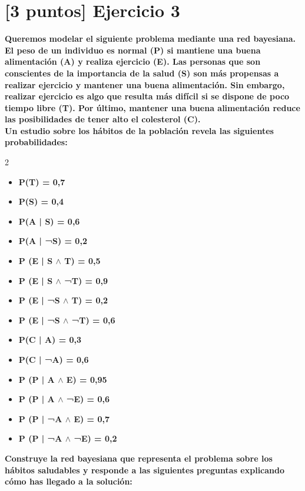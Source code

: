 \newpage
{}
\section{[3 puntos] Ejercicio 3}
\textbf{Queremos modelar el siguiente problema mediante una red bayesiana. El
peso de un individuo es normal (P) si mantiene una buena alimentación (A) y realiza
ejercicio (E). Las personas que son conscientes de la importancia de la salud (S) son
más propensas a realizar ejercicio y mantener una buena alimentación. Sin embargo,
realizar ejercicio es algo que resulta más difícil si se dispone de poco tiempo libre (T).
Por último, mantener una buena alimentación reduce las posibilidades de tener alto
el colesterol (C).} \\

\textbf{Un estudio sobre los hábitos de la población revela las siguientes probabilidades:} 
\begin{multicols}{2}
\begin{itemize}
    \item \textbf{P(T) = 0,7}
    \item \textbf{P(S) = 0,4}
    \item \textbf{P(A | S) = 0,6}
    \item \textbf{P(A | ¬S) = 0,2}
    \item \textbf{P (E | S $\land$ T) = 0,5}
    \item \textbf{P (E | S $\land$ ¬T) = 0,9}
    \item \textbf{P (E | ¬S $\land$ T) = 0,2}
    \item \textbf{P (E | ¬S $\land$ ¬T) = 0,6}
\end{itemize}

\columnbreak

\begin{itemize}
    \item \textbf{P(C | A) = 0,3}
    \item \textbf{P(C | ¬A) = 0,6}
    \item \textbf{P (P | A $\land$ E) = 0,95}
    \item \textbf{P (P | A $\land$ ¬E) = 0,6}
    \item \textbf{P (P | ¬A $\land$ E) = 0,7}
    \item \textbf{P (P | ¬A $\land$ ¬E) = 0,2}
\end{itemize}
\end{multicols}


\textbf{Construye la red bayesiana que representa el problema sobre los hábitos
saludables y responde a las siguientes preguntas explicando cómo has llegado a
la solución:} \\


